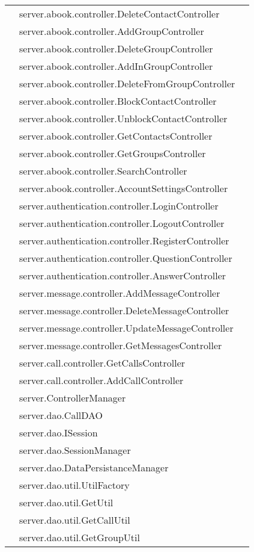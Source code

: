 \begin{center}
\begin{longtable}{lp{}l}
& server.abook.controller.DeleteContactController\\
& server.abook.controller.AddGroupController\\
& server.abook.controller.DeleteGroupController\\
& server.abook.controller.AddInGroupController\\
& server.abook.controller.DeleteFromGroupController\\
& server.abook.controller.BlockContactController\\
& server.abook.controller.UnblockContactController\\
& server.abook.controller.GetContactsController\\
& server.abook.controller.GetGroupsController\\
& server.abook.controller.SearchController\\
& server.abook.controller.AccountSettingsController\\
& server.authentication.controller.LoginController\\
& server.authentication.controller.LogoutController\\
& server.authentication.controller.RegisterController\\
& server.authentication.controller.QuestionController\\
& server.authentication.controller.AnswerController\\
& server.message.controller.AddMessageController\\
& server.message.controller.DeleteMessageController\\
& server.message.controller.UpdateMessageController\\
& server.message.controller.GetMessagesController\\
& server.call.controller.GetCallsController\\
& server.call.controller.AddCallController\\
& server.ControllerManager\\
& server.dao.CallDAO\\
& server.dao.ISession\\
& server.dao.SessionManager\\
& server.dao.DataPersistanceManager\\
& server.dao.util.UtilFactory\\
& server.dao.util.GetUtil\\
& server.dao.util.GetCallUtil\\
& server.dao.util.GetGroupUtil\\

\end{longtable}
\end{center}
